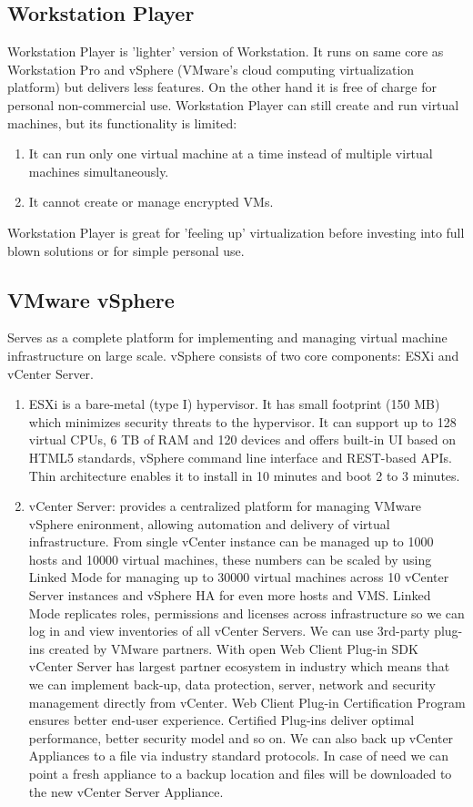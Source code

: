 \subsection{Workstation Player}
Workstation Player is 'lighter' version of Workstation. It runs on same core as Workstation Pro and vSphere (VMware's cloud computing virtualization platform) but delivers less features. On the other hand it is free of charge for personal non-commercial use. Workstation Player can still create and run virtual machines, but its functionality is limited:
\begin{enumerate}
\item It can run only one virtual machine at a time instead of multiple virtual machines simultaneously.
\item It cannot create or manage encrypted VMs.
\end{enumerate}
Workstation Player is great for 'feeling up' virtualization before investing into full blown solutions or for simple personal use.

\subsection{VMware vSphere}
Serves as a complete platform for implementing and managing virtual machine infrastructure on large scale. vSphere consists of two core components: ESXi and vCenter Server.
\begin{enumerate}
\item ESXi is a bare-metal (type I) hypervisor. It has small footprint (150 MB) which minimizes security threats to the hypervisor. It can support up to 128 virtual CPUs, 6 TB of RAM and 120 devices and offers built-in UI based on HTML5 standards, vSphere command line interface and REST-based APIs. Thin architecture enables it to install in 10 minutes and boot 2 to 3 minutes.
\item vCenter Server: provides a centralized platform for managing VMware vSphere enironment, allowing automation and delivery of virtual infrastructure. From single vCenter instance can be managed up to 1000 hosts and 10000 virtual machines, these numbers can be scaled by using Linked Mode for managing up to 30000 virtual machines across 10 vCenter Server instances and vSphere HA for even more hosts and VMS. Linked Mode replicates roles, permissions and licenses across infrastructure so we can log in and view inventories of all vCenter Servers. We can use 3rd-party plug-ins created by VMware partners. With open Web Client Plug-in SDK vCenter Server has largest partner ecosystem in industry which means that we can implement back-up, data protection, server, network and security management directly from vCenter. Web Client Plug-in Certification Program ensures better end-user experience. Certified Plug-ins deliver optimal performance, better security model and so on. We can also back up vCenter Appliances to a file via industry standard protocols. In case of need we can point a fresh appliance to a backup location and files will be downloaded to the new vCenter Server Appliance.
\end{enumerate}

